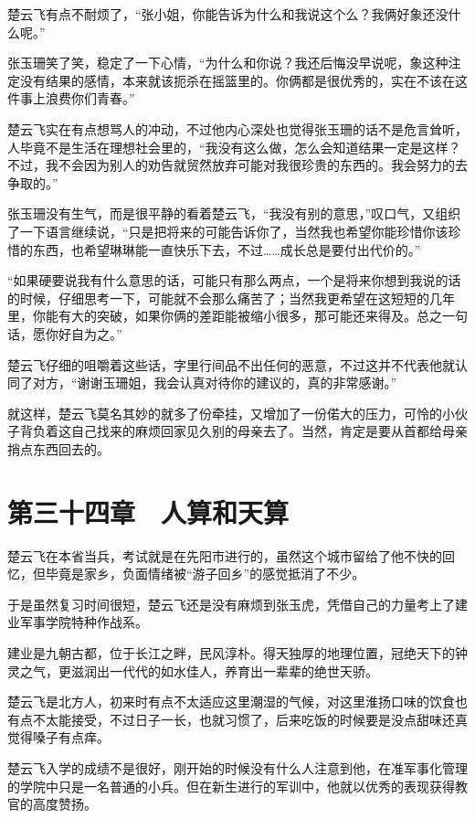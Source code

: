 楚云飞有点不耐烦了，“张小姐，你能告诉为什么和我说这个么？我俩好象还没什么呢。”

张玉珊笑了笑，稳定了一下心情，“为什么和你说？我还后悔没早说呢，象这种注定没有结果的感情，本来就该扼杀在摇篮里的。你俩都是很优秀的，实在不该在这件事上浪费你们青春。”

楚云飞实在有点想骂人的冲动，不过他内心深处也觉得张玉珊的话不是危言耸听，人毕竟不是生活在理想社会里的，“我没有这么做，怎么会知道结果一定是这样？不过，我不会因为别人的劝告就贸然放弃可能对我很珍贵的东西的。我会努力的去争取的。”

张玉珊没有生气，而是很平静的看着楚云飞，“我没有别的意思，”叹口气，又组织了一下语言继续说，“只是把将来的可能告诉你了，当然我也希望你能珍惜你该珍惜的东西，也希望琳琳能一直快乐下去，不过……成长总是要付出代价的。”

“如果硬要说我有什么意思的话，可能只有那么两点，一个是将来你想到我说的话的时候，仔细思考一下，可能就不会那么痛苦了；当然我更希望在这短短的几年里，你能有大的突破，如果你俩的差距能被缩小很多，那可能还来得及。总之一句话，愿你好自为之。”

楚云飞仔细的咀嚼着这些话，字里行间品不出任何的恶意，不过这并不代表他就认同了对方，“谢谢玉珊姐，我会认真对待你的建议的，真的非常感谢。”

就这样，楚云飞莫名其妙的就多了份牵挂，又增加了一份偌大的压力，可怜的小伙子背负着这自己找来的麻烦回家见久别的母亲去了。当然，肯定是要从首都给母亲捎点东西回去的。

\section{第三十四章　人算和天算}

楚云飞在本省当兵，考试就是在先阳市进行的，虽然这个城市留给了他不快的回忆，但毕竟是家乡，负面情绪被“游子回乡”的感觉抵消了不少。

于是虽然复习时间很短，楚云飞还是没有麻烦到张玉虎，凭借自己的力量考上了建业军事学院特种作战系。

建业是九朝古都，位于长江之畔，民风淳朴。得天独厚的地理位置，冠绝天下的钟灵之气，更滋润出一代代的如水佳人，养育出一辈辈的绝世天骄。

楚云飞是北方人，初来时有点不太适应这里潮湿的气候，对这里淮扬口味的饮食也有点不太能接受，不过日子一长，也就习惯了，后来吃饭的时候要是没点甜味还真觉得嗓子有点痒。

楚云飞入学的成绩不是很好，刚开始的时候没有什么人注意到他，在准军事化管理的学院中只是一名普通的小兵。但在新生进行的军训中，他就以优秀的表现获得教官的高度赞扬。


